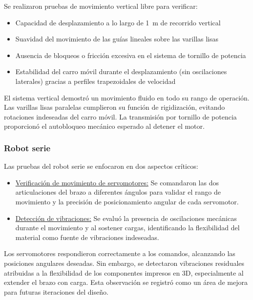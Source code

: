 Se realizaron pruebas de movimiento vertical libre para verificar:

\begin{itemize}[label=$\bullet$]
    \item Capacidad de desplazamiento a lo largo de 1~m de recorrido vertical
    \item Suavidad del movimiento de las guías lineales sobre las varillas lisas
    \item Ausencia de bloqueos o fricción excesiva en el sistema de tornillo de potencia
    \item Estabilidad del carro móvil durante el desplazamiento (sin oscilaciones laterales) gracias a perfiles trapezoidales de velocidad
\end{itemize}

El sistema vertical demostró un movimiento fluido en todo su rango de operación. Las varillas lisas paralelas cumplieron su función de rigidización, evitando rotaciones indeseadas del carro móvil. La transmisión por tornillo de potencia proporcionó el autobloqueo mecánico esperado al detener el motor.

\subsubsection{Robot serie}

Las pruebas del robot serie se enfocaron en dos aspectos críticos:

\begin{itemize}[label=$\bullet$]
    \item \underline{Verificación de movimiento de servomotores:} Se comandaron las dos articulaciones del brazo a diferentes ángulos para validar el rango de movimiento y la precisión de posicionamiento angular de cada servomotor.
    \item \underline{Detección de vibraciones:} Se evaluó la presencia de oscilaciones mecánicas durante el movimiento y al sostener cargas, identificando la flexibilidad del material como fuente de vibraciones indeseadas.
\end{itemize}

Los servomotores respondieron correctamente a los comandos, alcanzando las posiciones angulares deseadas. Sin embargo, se detectaron vibraciones residuales atribuidas a la flexibilidad de los componentes impresos en 3D, especialmente al extender el brazo con carga. Esta observación se registró como un área de mejora para futuras iteraciones del diseño.

